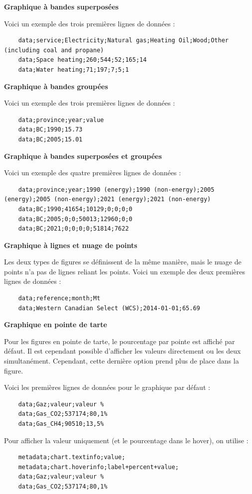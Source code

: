 \documentclass[11pt]{article}
\begin{document}
\textbf{Graphique à bandes superposées}

Voici un exemple des trois premières lignes de données :
\begin{lstlisting}
    data;service;Electricity;Natural gas;Heating Oil;Wood;Other (including coal and propane)
    data;Space heating;260;544;52;165;14
    data;Water heating;71;197;7;5;1
\end{lstlisting}

\textbf{Graphique à bandes groupées}

Voici un exemple des trois premières lignes de données :
\begin{lstlisting}
    data;province;year;value
    data;BC;1990;15.73
    data;BC;2005;15.01
\end{lstlisting}

\textbf{Graphique à bandes superposées et groupées}

Voici un exemple des quatre premières lignes de données :
\begin{lstlisting}
    data;province;year;1990 (energy);1990 (non-energy);2005 (energy);2005 (non-energy);2021 (energy);2021 (non-energy)
    data;BC;1990;41654;10129;0;0;0;0
    data;BC;2005;0;0;50013;12960;0;0
    data;BC;2021;0;0;0;0;51814;7622
\end{lstlisting}

\textbf{Graphique à lignes et nuage de points}

Les deux types de figures se définissent de la même manière, mais le nuage de points n'a pas de lignes reliant les points. Voici un exemple des deux premières lignes de données :
\begin{lstlisting}
    data;reference;month;Mt
    data;Western Canadian Select (WCS);2014-01-01;65.69
\end{lstlisting}

\textbf{Graphique en pointe de tarte}

Pour les figures en pointe de tarte, le pourcentage par pointe est affiché par défaut. Il est cependant possible d'afficher les valeurs directement ou les deux simultanément. Cependant, cette dernière option prend plus de place dans la figure.

Voici les premières lignes de données pour le graphique par défaut :
\begin{lstlisting}
    data;Gaz;valeur;valeur %
    data;Gas_CO2;537174;80,1%
    data;Gas_CH4;90510;13,5%
\end{lstlisting}

Pour afficher la valeur uniquement (et le pourcentage dans le hover), on utilise :
\begin{lstlisting}
    metadata;chart.textinfo;value;
    metadata;chart.hoverinfo;label+percent+value;
    data;Gaz;valeur;valeur %
    data;Gas_CO2;537174;80,1%
\end{lstlisting}
\end{document}
